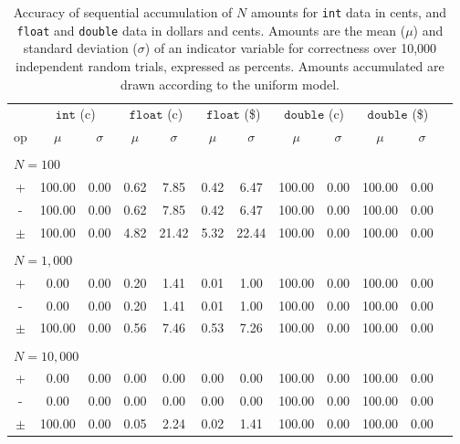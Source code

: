 \documentclass[11pt, oneside]{amsart}   	%
\begin{document}
\begin{table}[ht]
\begin{center}
\caption{Accuracy of sequential accumulation of $N$ amounts for \texttt{int} data in cents, and \texttt{float} and \texttt{double} data in dollars and cents. Amounts are the mean ($\mu$) and standard deviation ($\sigma$) of an indicator variable for correctness over 10,000 independent random trials, expressed as percents. Amounts accumulated are drawn according to the uniform model.}
\label{TBL:draft-uniform}
\begin{tabular}{ c c c c c c c c c c c c } 
& \multicolumn{2}{c}{$\texttt{int}$ (c)}
& \multicolumn{2}{c}{$\texttt{float}$ (c)}
& \multicolumn{2}{c}{$\texttt{float}$ (\$)}
& \multicolumn{2}{c}{$\texttt{double}$ (c)}
& \multicolumn{2}{c}{$\texttt{double}$ (\$)} \\
op & $\mu$ & $\sigma$ & $\mu$ & $\sigma$ & $\mu$ & $\sigma$ & $\mu$ & $\sigma$ & $\mu$ & $\sigma$ \\ \hline
\\ \multicolumn{11}{l}{$N = 100$} \\ \hline
+ & 100.00 & 0.00 & 0.62 & 7.85 & 0.42 & 6.47 & 100.00 & 0.00 & 100.00 & 0.00 \\
- & 100.00 & 0.00 & 0.62 & 7.85 & 0.42 & 6.47 & 100.00 & 0.00 & 100.00 & 0.00 \\
$\pm$ & 100.00 & 0.00 & 4.82 & 21.42 & 5.32 & 22.44 & 100.00 & 0.00 & 100.00 & 0.00 \\
\\ \multicolumn{11}{l}{$N = 1,000$} \\ \hline
+ & 0.00 & 0.00 & 0.20 & 1.41 & 0.01 & 1.00 & 100.00 & 0.00 & 100.00 & 0.00 \\
- & 0.00 & 0.00 & 0.20 & 1.41 & 0.01 & 1.00 & 100.00 & 0.00 & 100.00 & 0.00 \\
$\pm$ & 100.00 & 0.00 & 0.56 & 7.46 & 0.53 & 7.26 & 100.00 & 0.00 & 100.00 & 0.00 \\
\\ \multicolumn{11}{l}{$N = 10,000$} \\ \hline
+ & 0.00 & 0.00 & 0.00 & 0.00 & 0.00 & 0.00 & 100.00 & 0.00 & 100.00 & 0.00 \\
- & 0.00 & 0.00 & 0.00 & 0.00 & 0.00 & 0.00 & 100.00 & 0.00 & 100.00 & 0.00 \\
$\pm$ & 100.00 & 0.00 & 0.05 & 2.24 & 0.02 & 1.41 & 100.00 & 0.00 & 100.00 & 0.00 \\

\end{tabular}
\end{center}
\end{table}
\end{document}
